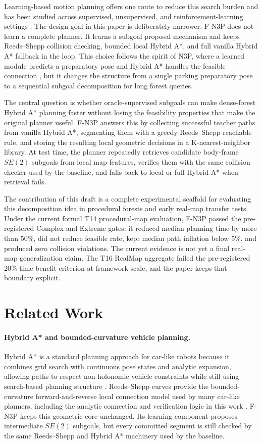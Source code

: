 \documentclass[11pt,a4paper]{article}
\begin{document}
Learning-based motion planning offers one route to reduce this search burden and has been studied across supervised, unsupervised, and reinforcement-learning settings \cite{Wang2021LearningMotionPlanning}. The design goal in this paper is deliberately narrower. F-N3P does not learn a complete planner. It learns a subgoal proposal mechanism and keeps Reeds--Shepp collision checking, bounded local Hybrid A*, and full vanilla Hybrid A* fallback in the loop. This choice follows the spirit of N3P, where a learned module predicts a preparatory pose and Hybrid A* handles the feasible connection \cite{Xue2026N3P}, but it changes the structure from a single parking preparatory pose to a sequential subgoal decomposition for long forest queries.

The central question is whether oracle-supervised subgoals can make dense-forest Hybrid A* planning faster without losing the feasibility properties that make the original planner useful. F-N3P answers this by collecting successful teacher paths from vanilla Hybrid A*, segmenting them with a greedy Reeds--Shepp-reachable rule, and storing the resulting local geometric decisions in a K-nearest-neighbor library. At test time, the planner repeatedly retrieves candidate body-frame $SE(2)$ subgoals from local map features, verifies them with the same collision checker used by the baseline, and falls back to local or full Hybrid A* when retrieval fails.

The contribution of this draft is a complete experimental scaffold for evaluating this decomposition idea in procedural forests and early real-map transfer tests. Under the current formal T14 procedural-map evaluation, F-N3P passed the pre-registered Complex and Extreme gates: it reduced median planning time by more than 50\%, did not reduce feasible rate, kept median path inflation below 5\%, and produced zero collision violations. The current evidence is not yet a final real-map generalization claim. The T16 RealMap aggregate failed the pre-registered 20\% time-benefit criterion at framework scale, and the paper keeps that boundary explicit.

\section{Related Work}
\label{sec:related}
\paragraph{Hybrid A* and bounded-curvature vehicle planning.}
Hybrid A* is a standard planning approach for car-like robots because it combines grid search with continuous pose states and analytic expansion, allowing paths to respect non-holonomic vehicle constraints while still using search-based planning structure \cite{Dolgov2010HybridAstar,Sormoli2024HybridSurvey}. Reeds--Shepp curves provide the bounded-curvature forward-and-reverse local connection model used by many car-like planners, including the analytic connection and verification logic in this work \cite{ReedsShepp1990}. F-N3P keeps this geometric core unchanged. Its learning component proposes intermediate $SE(2)$ subgoals, but every committed segment is still checked by the same Reeds--Shepp and Hybrid A* machinery used by the baseline.
\end{document}
